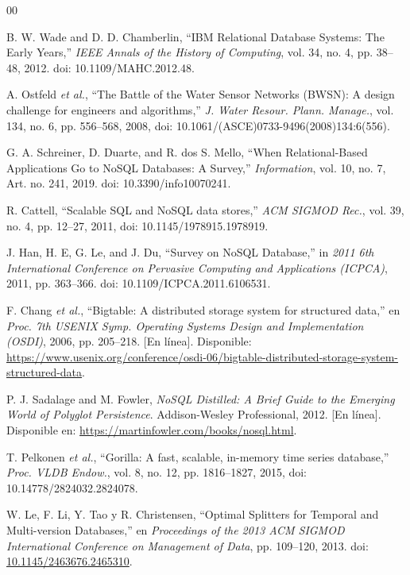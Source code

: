 \documentclass[conference]{IEEEtran}
\begin{document}
\begin{thebibliography}{00}

B. W. Wade and D. D. Chamberlin,
``IBM Relational Database Systems: The Early Years,''
\textit{IEEE Annals of the History of Computing},
vol. 34, no. 4, pp. 38--48, 2012.
doi: 10.1109/MAHC.2012.48.


 A. Ostfeld \emph{et al.}, ``The Battle of the Water Sensor Networks (BWSN): A design challenge for engineers and algorithms,'' \emph{J. Water Resour. Plann. Manage.}, vol. 134, no. 6, pp. 556--568, 2008, doi: 10.1061/(ASCE)0733-9496(2008)134:6(556).

G. A. Schreiner, D. Duarte, and R. dos S. Mello,
``When Relational-Based Applications Go to NoSQL
Databases: A Survey,''
\textit{Information},
vol. 10, no. 7, Art. no. 241, 2019.
doi: 10.3390/info10070241.

 R. Cattell, ``Scalable SQL and NoSQL data stores,'' \emph{ACM SIGMOD Rec.}, vol. 39, no. 4, pp. 12--27, 2011, doi: 10.1145/1978915.1978919.

J. Han, H. E, G. Le, and J. Du,
``Survey on NoSQL Database,''
in \textit{2011 6th International Conference on
Pervasive Computing and Applications (ICPCA)},
2011, pp. 363--366.
doi: 10.1109/ICPCA.2011.6106531.

 F. Chang \emph{et al.}, ``Bigtable: A distributed storage system for structured data,'' en \emph{Proc. 7th USENIX Symp. Operating Systems Design and Implementation (OSDI)}, 2006, pp. 205--218. [En línea]. Disponible: \url{https://www.usenix.org/conference/osdi-06/bigtable-distributed-storage-system-structured-data}.

P. J. Sadalage and M. Fowler,
\textit{NoSQL Distilled: A Brief Guide to the
Emerging World of Polyglot Persistence}.
Addison-Wesley Professional, 2012.
[En línea]. Disponible en:
\url{https://martinfowler.com/books/nosql.html}.

 T. Pelkonen \emph{et al.}, ``Gorilla: A fast, scalable, in-memory time series database,'' \emph{Proc. VLDB Endow.}, vol. 8, no. 12, pp. 1816--1827, 2015, doi: 10.14778/2824032.2824078.

W. Le, F. Li, Y. Tao y R. Christensen,
``Optimal Splitters for Temporal and Multi-version Databases,''
en \textit{Proceedings of the 2013 ACM SIGMOD International Conference on Management of Data},
pp. 109--120, 2013.
doi: \href{https://doi.org/10.1145/2463676.2465310}{10.1145/2463676.2465310}.


\end{thebibliography}
\end{document}

